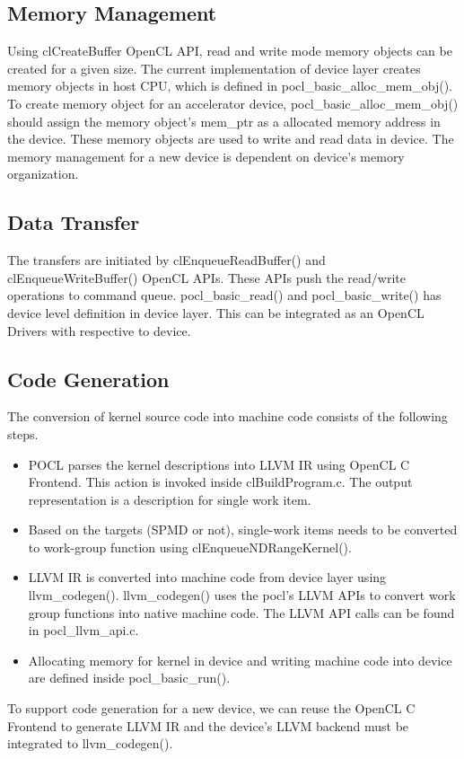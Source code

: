\subsection{Memory Management}
Using clCreateBuffer OpenCL API, read and write mode memory objects can be created for a given size. The current implementation of device layer creates memory objects in host CPU, which is  defined in pocl\_basic\_alloc\_mem\_obj(). To create memory object for an accelerator device, pocl\_basic\_alloc\_mem\_obj() should assign the memory object's mem\_ptr as a allocated memory address in the device. These memory objects are used to write and read data in device. The memory management for a new device is dependent on device's memory organization.

\subsection{Data Transfer}
The transfers are initiated by clEnqueueReadBuffer() and clEnqueueWriteBuffer() OpenCL APIs. These APIs push the read/write operations to command queue. pocl\_basic\_read() and pocl\_basic\_write() has device level definition in device layer. This can be integrated as an OpenCL Drivers with respective to device.

\subsection{Code Generation}
The conversion of kernel source code into machine code consists of the following steps.
\begin{itemize}
	\item POCL parses the kernel descriptions into LLVM IR using OpenCL C Frontend. This action is invoked inside clBuildProgram.c. The output representation is a description for single work item.
	\item Based on the targets (SPMD or not), single-work items needs to be converted to work-group function using clEnqueueNDRangeKernel().
	\item LLVM IR is converted into machine code from device layer using llvm\_codegen(). llvm\_codegen() uses the pocl's LLVM APIs to convert work group functions into native machine code. The LLVM API calls can be found in pocl\_llvm\_api.c.
	\item Allocating memory for kernel in device and writing machine code into device are defined inside pocl\_basic\_run().
\end{itemize}
To support code generation for a new device, we can reuse the OpenCL C Frontend to generate LLVM IR and the device's LLVM backend must be integrated to llvm\_codegen().
